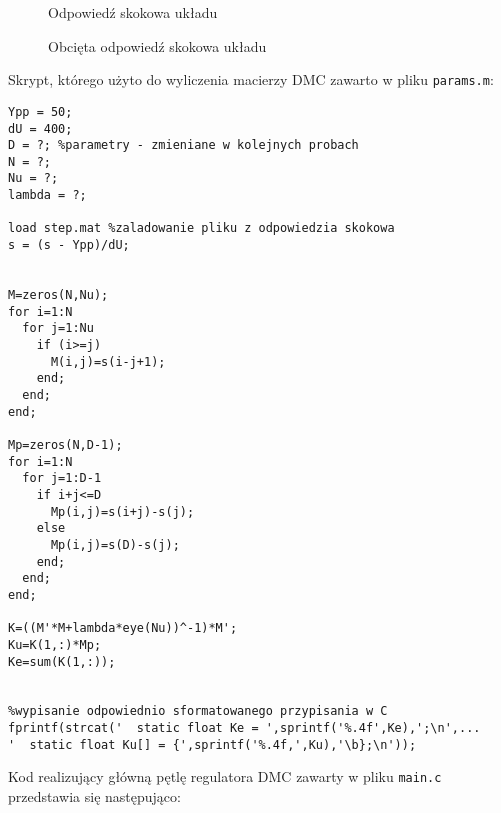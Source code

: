 \begin{figure}[H]
\centering

\caption{Odpowiedź skokowa układu}
\label{DMC1}
\end{figure}

\begin{figure}[H]
\centering

\caption{Obcięta odpowiedź skokowa układu}
\label{DMC2}
\end{figure}

Skrypt, którego użyto do wyliczenia macierzy DMC zawarto w pliku \verb|params.m|:

\begin{lstlisting}[style=Matlab-editor]
Ypp = 50;
dU = 400;
D = ?; %parametry - zmieniane w kolejnych probach
N = ?;
Nu = ?;
lambda = ?;

load step.mat %zaladowanie pliku z odpowiedzia skokowa
s = (s - Ypp)/dU;


M=zeros(N,Nu);
for i=1:N
  for j=1:Nu
    if (i>=j)
      M(i,j)=s(i-j+1);
    end;
  end;
end;

Mp=zeros(N,D-1);
for i=1:N
  for j=1:D-1
    if i+j<=D
      Mp(i,j)=s(i+j)-s(j);
    else
      Mp(i,j)=s(D)-s(j);
    end;
  end;
end;

K=((M'*M+lambda*eye(Nu))^-1)*M';
Ku=K(1,:)*Mp;
Ke=sum(K(1,:));


%wypisanie odpowiednio sformatowanego przypisania w C
fprintf(strcat('  static float Ke = ',sprintf('%.4f',Ke),';\n',...
'  static float Ku[] = {',sprintf('%.4f,',Ku),'\b};\n'));

\end{lstlisting}

Kod realizujący główną pętlę regulatora DMC zawarty w pliku \verb|main.c| przedstawia się następująco:

